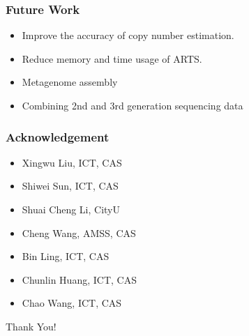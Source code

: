 \documentclass[mathserif]{beamer}
\begin{document}
		\begin{frame} 
			\frametitle{Future Work}
			\begin{itemize}
				\item Improve the accuracy of copy number estimation. 	
				\item Reduce memory and time usage of ARTS.
				\item Metagenome assembly
				\item Combining 2nd and 3rd generation sequencing data 
			\end{itemize}	
		\end{frame}
		\begin{frame}
			\frametitle{Acknowledgement}
			\begin{itemize}
				\item Xingwu Liu, ICT, CAS
				\item Shiwei Sun, ICT, CAS
				\item Shuai Cheng Li, CityU
				\item Cheng Wang, AMSS, CAS
				\item Bin Ling, ICT, CAS
				\item Chunlin Huang, ICT, CAS
				\item Chao Wang, ICT, CAS
			\end{itemize}
		\end{frame}
		\begin{frame}	
			\Huge{\centerline{Thank You!}}
		\end{frame}
		
\end{document}
